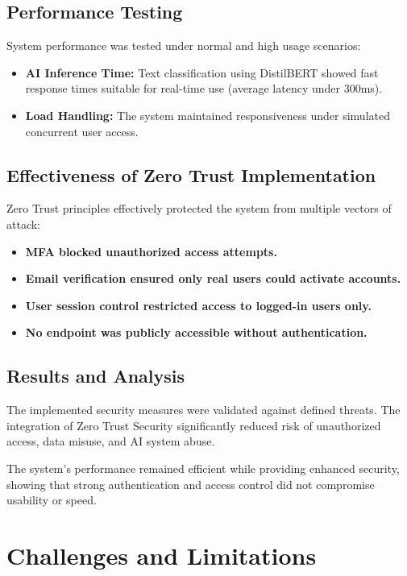 \documentclass[a4paper,12pt]{article}
\begin{document}
\subsection{Performance Testing}
System performance was tested under normal and high usage scenarios:

\begin{itemize}
    \item \textbf{AI Inference Time:} Text classification using DistilBERT showed fast response times suitable for real-time use (average latency under 300ms).
    \item \textbf{Load Handling:} The system maintained responsiveness under simulated concurrent user access.
\end{itemize}

\subsection{Effectiveness of Zero Trust Implementation}
Zero Trust principles effectively protected the system from multiple vectors of attack:

\begin{itemize}
    \item \textbf{MFA blocked unauthorized access attempts.}
    \item \textbf{Email verification ensured only real users could activate accounts.}
    \item \textbf{User session control restricted access to logged-in users only.}
    \item \textbf{No endpoint was publicly accessible without authentication.}
\end{itemize}

\subsection{Results and Analysis}
The implemented security measures were validated against defined threats. The integration of Zero Trust Security significantly reduced risk of unauthorized access, data misuse, and AI system abuse.

The system's performance remained efficient while providing enhanced security, showing that strong authentication and access control did not compromise usability or speed.


\section{Challenges and Limitations}
\end{document}
